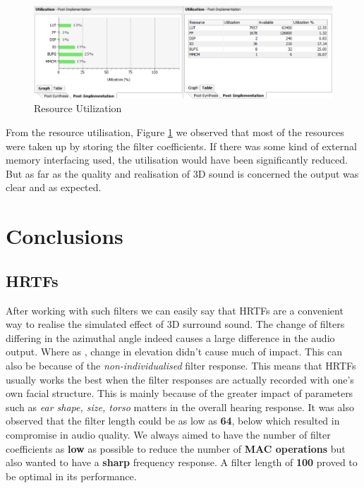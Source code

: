 \documentclass[BTech]{nitkdiss}
\begin{document}
\begin{figure}
    \centering
    \includegraphics[width = \textwidth]{utilisation.png}
    \caption{Resource Utilization}
    \label{fig:utilise}
\end{figure}

From the resource utilisation, Figure \ref{fig:utilise} we observed that most of the resources were taken up by storing the filter coefficients. If there was some kind of external memory interfacing used, the utilisation would have been significantly reduced. But as far as the quality and realisation of 3D sound is concerned the output was clear and as expected.


\chapter{Conclusions}

\section{HRTFs}
After working with such filters we can easily say that HRTFs are a convenient way to realise the simulated effect of 3D surround sound. The change of filters differing in the azimuthal angle indeed causes a large difference in the audio output. Where as , change in elevation didn't cause much of impact. This can also be because of the \textit{non-individualised} filter response. This means that HRTFs usually works the best when the filter responses are actually recorded with one's own facial structure. This is mainly because of the greater impact of parameters such as \textit{ear shape, size, torso} matters in the overall hearing response. It was also observed that the filter length could be as low as \textbf{64}, below which resulted in compromise in audio quality. We always aimed to have the number of filter coefficients as \textbf{low} as possible to reduce the number of \textbf{MAC operations} but also wanted to have a \textbf{sharp} frequency response. A filter length of \textbf{100} proved to be optimal in its performance.   
\end{document}

